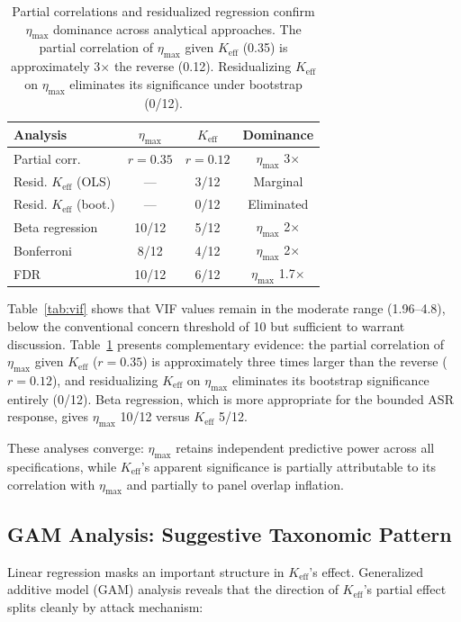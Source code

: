 \documentclass[11pt,a4paper]{article}
\newcommand{\etamax}{\ensuremath{\eta_{\max}}}
\newcommand{\keff}{\ensuremath{K_{\text{eff}}}}
\begin{document}
\begin{table}[t]
\centering
\small
\begin{tabular}{lccc}
\toprule
\textbf{Analysis} & \textbf{$\etamax$} & \textbf{$\keff$} & \textbf{Dominance} \\
\midrule
Partial corr. & $r=0.35$ & $r=0.12$ & $\etamax$ 3$\times$ \\
Resid. $\keff$ (OLS) & --- & 3/12 & Marginal \\
Resid. $\keff$ (boot.) & --- & 0/12 & Eliminated \\
Beta regression & 10/12 & 5/12 & $\etamax$ 2$\times$ \\
Bonferroni & 8/12 & 4/12 & $\etamax$ 2$\times$ \\
FDR & 10/12 & 6/12 & $\etamax$ 1.7$\times$ \\
\bottomrule
\end{tabular}
\caption{Partial correlations and residualized regression confirm $\etamax$ dominance across analytical approaches.
The partial correlation of $\etamax$ given $\keff$ (0.35) is approximately 3$\times$ the reverse (0.12).
Residualizing $\keff$ on $\etamax$ eliminates its significance under bootstrap (0/12).}
\label{tab:partial}
\end{table}

Table~\ref{tab:vif} shows that VIF values remain in the moderate range (1.96--4.8), below the conventional concern threshold of 10 but sufficient to warrant discussion.
Table~\ref{tab:partial} presents complementary evidence: the partial correlation of $\etamax$ given $\keff$ ($r=0.35$) is approximately three times larger than the reverse ($r=0.12$), and residualizing $\keff$ on $\etamax$ eliminates its bootstrap significance entirely (0/12).
Beta regression, which is more appropriate for the bounded ASR response, gives $\etamax$ 10/12 versus $\keff$ 5/12.

These analyses converge: $\etamax$ retains independent predictive power across all specifications, while $\keff$'s apparent significance is partially attributable to its correlation with $\etamax$ and partially to panel overlap inflation.

\subsection{GAM Analysis: Suggestive Taxonomic Pattern}
\label{sec:gam}

Linear regression masks an important structure in $\keff$'s effect.
Generalized additive model (GAM) analysis reveals that the direction of $\keff$'s partial effect splits cleanly by attack mechanism:
\end{document}
